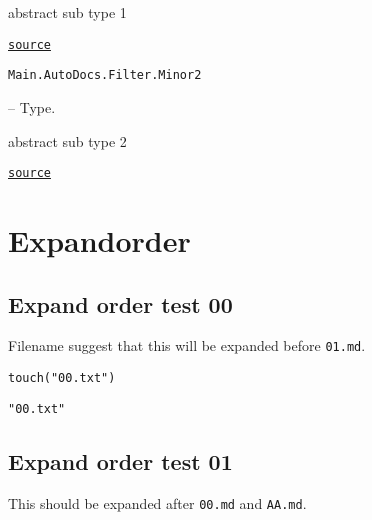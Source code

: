\begin{adjustwidth}{2em}{0pt}

abstract sub type 1



\href{https://github.com/BambOoxX/Documenter.jl/blob/d157febde213549ed0d45c894f0651560da477d3/test/examples/make.jl#L132}{\texttt{source}}


\end{adjustwidth}
\hypertarget{4245242374026494985}{\texttt{Main.AutoDocs.Filter.Minor2}}  -- {Type.}

\begin{adjustwidth}{2em}{0pt}

abstract sub type 2



\href{https://github.com/BambOoxX/Documenter.jl/blob/d157febde213549ed0d45c894f0651560da477d3/test/examples/make.jl#L135}{\texttt{source}}


\end{adjustwidth}

\part{Expandorder}


\chapter{Expand order test 00}



\label{6834115470379416000}{}


Filename suggest that this will be expanded before \texttt{01.md}.




\begin{lstlisting}[]
touch("00.txt")
\end{lstlisting}


\begin{lstlisting}[]
"00.txt"
\end{lstlisting}



\chapter{Expand order test 01}



\label{16473237151146092639}{}


This should be expanded after \texttt{00.md} and \texttt{AA.md}.




